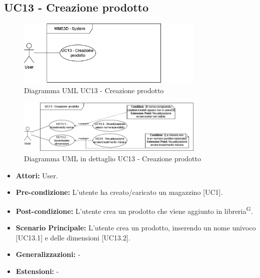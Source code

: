 \subsection{UC13 - Creazione prodotto}
\begin{figure}[H]
  \centering
  \includegraphics[width=0.8\textwidth]{UC_diagrams_11-20/UC13_sys.drawio.png}
   \caption{Diagramma UML UC13 - Creazione prodotto}
\end{figure}
\begin{figure}[H]
  \centering
  \includegraphics[width=0.8\textwidth]{UC_diagrams_11-20/UC13.drawio.png}
   \caption{Diagramma UML in dettaglio UC13 - Creazione prodotto}
\end{figure}
\begin{itemize}
    \item \textbf{Attori:} User.
    \item \textbf{Pre-condizione:}  L'utente ha creato/caricato un magazzino [UC1].
    \item \textbf{Post-condizione:} L'utente crea un prodotto che viene aggiunto in libreria\textsuperscript{G}.
    \item \textbf{Scenario Principale:}  L'utente crea un prodotto, inserendo un nome univoco [UC13.1] e delle dimensioni [UC13.2].
    \item \textbf{Generalizzazioni:} -
    \item \textbf{Estensioni:} -
\end{itemize}


